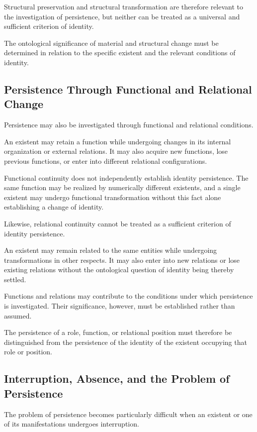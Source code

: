 Structural preservation and structural transformation
are therefore relevant to the investigation of persistence,
but neither can be treated as a universal and sufficient
criterion of identity.

The ontological significance of material and structural
change must be determined in relation to the specific
existent and the relevant conditions of identity.

\subsection{Persistence Through Functional and Relational Change}

Persistence may also be investigated through functional
and relational conditions.

An existent may retain a function while undergoing
changes in its internal organization or external relations.
It may also acquire new functions, lose previous functions,
or enter into different relational configurations.

Functional continuity does not independently establish
identity persistence. The same function may be realized
by numerically different existents, and a single existent
may undergo functional transformation without this fact
alone establishing a change of identity.

Likewise, relational continuity cannot be treated as
a sufficient criterion of identity persistence.

An existent may remain related to the same entities
while undergoing transformations in other respects.
It may also enter into new relations or lose existing
relations without the ontological question of identity
being thereby settled.

Functions and relations may contribute to the conditions
under which persistence is investigated. Their significance,
however, must be established rather than assumed.

The persistence of a role, function, or relational position
must therefore be distinguished from the persistence
of the identity of the existent occupying that role
or position.

\subsection{Interruption, Absence, and the Problem of Persistence}

The problem of persistence becomes particularly difficult
when an existent or one of its manifestations undergoes
interruption.

